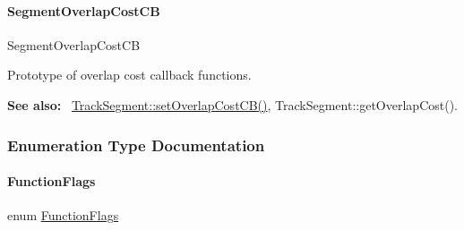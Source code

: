 \paragraph{\texorpdfstring{Segment\+Overlap\+Cost\+CB}{SegmentOverlapCostCB}}
{\footnotesize\ttfamily Segment\+Overlap\+Cost\+CB}

Prototype of overlap cost callback functions.

{\bfseries See also\+:}~ \hyperlink{classKite_1_1TrackElement_a4648fa47d0870cf743436ff6a6239fd9}{Track\+Segment\+::set\+Overlap\+Cost\+C\+B()}, Track\+Segment\+::get\+Overlap\+Cost(). 

\subsubsection{Enumeration Type Documentation}
\mbox{\label{namespaceKite_acca8fffa3182dea5f94208f454f14b47}} 
\paragraph{\texorpdfstring{Function\+Flags}{FunctionFlags}}
{\footnotesize\ttfamily enum \hyperlink{namespaceKite_acca8fffa3182dea5f94208f454f14b47}{Function\+Flags}}

